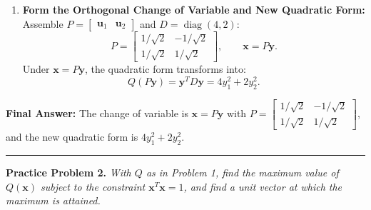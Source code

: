 \documentclass[11pt, letterpaper]{article}
\theoremstyle{definition}
\theoremstyle{remark}
\begin{document}
\begin{enumerate}[label=\textbf{Step \arabic*:}]
\begin{itemize}
        \[
        \begin{bmatrix} 1 & 1 \\ 1 & 1 \end{bmatrix} \begin{bmatrix} x_1 \\ x_2 \end{bmatrix} = \begin{bmatrix} 0 \\ 0 \end{bmatrix} \implies x_1 + x_2 = 0 \implies x_1 = -x_2.
        \]
        Choosing $x_2 = 1$ gives $\mathbf{v}_2 = \begin{bmatrix} -1 \\ 1 \end{bmatrix}$ with norm $\|\mathbf{v}_2\| = \sqrt{(-1)^2 + 1^2} = \sqrt{2}$. Normalizing yields:
        \[
        \mathbf{u}_2 = \frac{\mathbf{v}_2}{\|\mathbf{v}_2\|} = \begin{bmatrix} -1/\sqrt{2} \\ 1/\sqrt{2} \end{bmatrix}.
        \]
    \end{itemize}
    \item \textbf{Form the Orthogonal Change of Variable and New Quadratic Form:}
    Assemble $P = \begin{bmatrix} \mathbf{u}_1 & \mathbf{u}_2 \end{bmatrix}$ and $D = \operatorname{diag}(4, 2)$:
    \[
    P = \begin{bmatrix} 1/\sqrt{2} & -1/\sqrt{2} \\ 1/\sqrt{2} & 1/\sqrt{2} \end{bmatrix}, \qquad \mathbf{x} = P\mathbf{y}.
    \]
    Under $\mathbf{x} = P\mathbf{y}$, the quadratic form transforms into:
    \[
    Q(P\mathbf{y}) = \mathbf{y}^T D \mathbf{y} = 4y_1^2 + 2y_2^2.
    \]
\end{enumerate}
\textbf{Final Answer:} The change of variable is $\mathbf{x} = P\mathbf{y}$ with $P = \begin{bmatrix} 1/\sqrt{2} & -1/\sqrt{2} \\ 1/\sqrt{2} & 1/\sqrt{2} \end{bmatrix}$, and the new quadratic form is $4y_1^2 + 2y_2^2$.

\medskip
\hrule
\medskip

\textbf{Practice Problem 2.} \emph{With $Q$ as in Problem 1, find the maximum value of $Q(\mathbf{x})$ subject to the constraint $\mathbf{x}^T\mathbf{x} = 1$, and find a unit vector at which the maximum is attained.}
\end{document}
